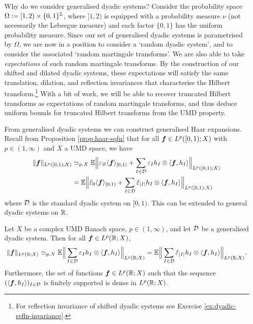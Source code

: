 Why do we consider generalised dyadic systems?
Consider the probability space $\Omega := [1,2) \times \{0,1\}^{\mathbb{Z}}$, where $[1,2)$ is equipped with a probability measure $\nu$ (not necessarily the Lebesgue measure) and each factor $\{0,1\}$ has the uniform probability measure.
Since our set of generalised dyadic systems is parametrised by $\Omega$, we are now in a position to consider a `random dyadic system', and to consider the associated `random martingale transforms'.
We are also able to take \emph{expectations} of such random martingale transforms.
By the construction of our shifted and dilated dyadic systems, these expectations will satisfy the same translation, dilation, and reflection invariances that characterise the Hilbert transform.\footnote{For reflection invariance of shifted dyadic systems see Exercise \ref{ex:dyadic-refln-invariance}.}
With a bit of work, we will be able to recover truncated Hilbert transforms as expectations of random martingale transforms, and thus deduce uniform bounds for truncated Hilbert transforms from the UMD property.

From generalised dyadic systems we can construct generalised Haar expansions.
Recall from Proposition \ref{prop:haar-sqfn} that for all $\bm{f} \in L^p([0,1);X)$ with $p \in (1,\infty)$ and $X$ a UMD space, we have 
  \begin{equation*}
    \begin{aligned}
    \|\bm{f}\|_{L^p([0,1);X)}
    &\simeq_{p,X} \mathbb{E} \Big\| \varepsilon_{\varnothing} \langle \bm{f} \rangle_{[0,1)} +  \sum_{I \in \mathcal{D}} \varepsilon_{I} h_{I} \otimes \langle \bm{f}, h_{I} \rangle \Big\|_{L^p([0,1);X)} \\
    &= \mathbb{E} \Big\| \tilde{\varepsilon}_{0} \langle \bm{f} \rangle_{[0,1)} + \sum_{I \in \mathcal{D}} \tilde{\varepsilon}_{|I|} h_{I} \otimes \langle \bm{f}, h_{I} \rangle \Big\|_{L^p([0,1);X)}
  \end{aligned}
\end{equation*}
where $\mathcal{D}$ is the standard dyadic system on $[0,1)$.
This can be extended to general dyadic systems on $\mathbb{R}$.

\begin{thm}\label{thm:general-haar-decompositions}
  Let $X$ be a complex UMD Banach space, $p \in (1,\infty)$, and let $\mathcal{D}$ be a generalised dyadic system.
  Then for all $\bm{f} \in L^p(\mathbb{R};X)$,
  \begin{equation}\label{eq:gen-haar-sqfn}
      \|\bm{f}\|_{L^p(\mathbb{R};X)}
      \simeq_{p,X} \mathbb{E} \Big\| \sum_{I \in \mathcal{D}} \varepsilon_{I} h_{I} \otimes \langle \bm{f}, h_{I} \rangle \Big\|_{L^p(\mathbb{R};X)} 
      = \mathbb{E} \Big\| \sum_{I \in \mathcal{D}} \tilde{\varepsilon}_{|I|} h_{I} \otimes \langle \bm{f}, h_{I} \rangle \Big\|_{L^p(\mathbb{R};X)}.
    \end{equation}
    Furthermore, the set of functions $\bm{f} \in L^p(\mathbb{R};X)$ such that the sequence $(\langle \bm{f}, h_{I} \rangle)_{I \in \mathcal{D}}$ is finitely supported is dense in $L^p(\mathbb{R};X)$.
\end{thm}


